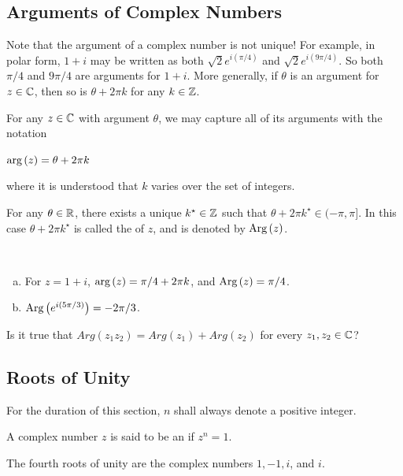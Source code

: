\documentclass[11pt,fleqn,dvipsnames,usenames]{article}
\newcommand{\p}{\noindent}
\begin{document}
\subsection{Arguments of Complex Numbers}

\p Note that the argument of a complex number is not unique!  For example, in polar form, $1 + i$ may be written as both $\sqrt{2}e^{i(\pi/4)}$ and $\sqrt{2}e^{i(9\pi/4)}$.  So both $\pi/4$ and $9\pi/4$ are arguments for $1 + i$.  More generally, if $\theta$ is an argument for $z\in\mathbb{C}$, then so is $\theta + 2\pi k$ for any $k\in \mathbb{Z}$.
\vsp

\notation For any $z\in\mathbb{C}$ with argument $\theta$, we may capture all of its arguments with the notation
\begin{center}
$\text{arg}\left(z\right) = \theta + 2\pi k$
\end{center}
where it is understood that $k$ varies over the set of integers.
\vsp

\fact For any $\theta\in\mathbb{R}$, there exists a unique $k^{\star}\in\mathbb{Z}$ such that $\theta + 2\pi k^{\star}\in (-\pi, \pi]$.  In this case $\theta + 2\pi k^{\star}$ is called the  of $z$, and is denoted by $\text{Arg}\left(z\right)$.
\vsp

\begin{examples}~
\begin{enumerate}[(a)]
\item For $z = 1 + i$, $\text{arg}\left(z\right) = \pi/4 + 2\pi k$, and $\text{Arg}\left(z\right) = \pi/4$.
\item $\text{Arg}\left(e^{i(5\pi/3)}\right) = -2\pi/3$.
\end{enumerate}
\end{examples}

\begin{exercise}
Is it true that $Arg(z_1z_2) = Arg(z_1) + Arg(z_2)$ for every $z_{1},z_{2}\in\mathbb{C}$?
\end{exercise}

\subsection{Roots of Unity}\label{rootsofunitysection}

\p For the duration of this section, $n$ shall always denote a positive integer.
%
\begin{definition}
A complex number $z$ is said to be an  if $z^{n} = 1$.
\end{definition}

\example The fourth roots of unity are the complex numbers $1, -1, i$, and $i$.
\vsp
\end{document}
